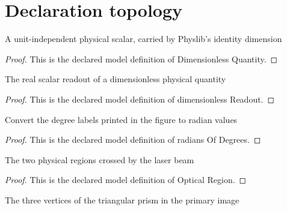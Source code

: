 \section{Declaration topology}
\begin{definition}
  \label{def:physics:phyx-mini-0050:phyxminiproblems-problemphyxmini0050-dimensionlessquantity}
  A unit-independent physical scalar, carried by Physlib's identity dimension
\end{definition}
\begin{proof}
  This is the declared model definition of Dimensionless Quantity.
\end{proof}
\begin{definition}
  \label{def:physics:phyx-mini-0050:phyxminiproblems-problemphyxmini0050-dimensionlessreadout}
  The real scalar readout of a dimensionless physical quantity
\end{definition}
\begin{proof}
  This is the declared model definition of dimensionless Readout.
\end{proof}
\begin{definition}
  \label{def:physics:phyx-mini-0050:phyxminiproblems-problemphyxmini0050-radiansofdegrees}
  Convert the degree labels printed in the figure to radian values
\end{definition}
\begin{proof}
  This is the declared model definition of radians Of Degrees.
\end{proof}
\begin{definition}
  \label{def:physics:phyx-mini-0050:phyxminiproblems-problemphyxmini0050-opticalregion}
  The two physical regions crossed by the laser beam
\end{definition}
\begin{proof}
  This is the declared model definition of Optical Region.
\end{proof}
\begin{definition}
  \label{def:physics:phyx-mini-0050:phyxminiproblems-problemphyxmini0050-prismvertex}
  The three vertices of the triangular prism in the primary image
\end{definition}
